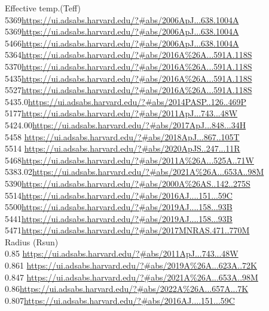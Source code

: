 Effective temp.(Teff)\\
5369\url{https://ui.adsabs.harvard.edu/?#abs/2006ApJ...638.1004A}\\
5369\url{https://ui.adsabs.harvard.edu/?#abs/2006ApJ...638.1004A}\\ 
5466\url{https://ui.adsabs.harvard.edu/?#abs/2006ApJ...638.1004A}\\
5364\url{https://ui.adsabs.harvard.edu/?#abs/2016A%26A...591A.118S}\\
5370\url{https://ui.adsabs.harvard.edu/?#abs/2016A%26A...591A.118S}\\
5435\url{https://ui.adsabs.harvard.edu/?#abs/2016A%26A...591A.118S}\\
5527\url{https://ui.adsabs.harvard.edu/?#abs/2016A%26A...591A.118S}\\
5435.0\url{https://ui.adsabs.harvard.edu/?#abs/2014PASP..126..469P}\\
5177\url{https://ui.adsabs.harvard.edu/?#abs/2011ApJ...743...48W}\\
5424.00\url{https://ui.adsabs.harvard.edu/?#abs/2017ApJ...848...34H}\\

5458 \url{https://ui.adsabs.harvard.edu/?#abs/2018ApJ...867..105T}\\
5514	\url{https://ui.adsabs.harvard.edu/?#abs/2020ApJS..247...11R}\\
5468\url{https://ui.adsabs.harvard.edu/?#abs/2011A%26A...525A..71W}\\
5383.02\url{https://ui.adsabs.harvard.edu/?#abs/2021A%26A...653A..98M}\\
5390\url{https://ui.adsabs.harvard.edu/?#abs/2000A%26AS..142..275S}\\
5514\url{https://ui.adsabs.harvard.edu/?#abs/2016AJ....151...59C}\\
5500\url{https://ui.adsabs.harvard.edu/?#abs/2019AJ....158...93B}\\
5441\url{https://ui.adsabs.harvard.edu/?#abs/2019AJ....158...93B}\\
5471\url{https://ui.adsabs.harvard.edu/?#abs/2017MNRAS.471..770M}\\


Radius (Rsun)\\
0.85	\url{https://ui.adsabs.harvard.edu/?#abs/2011ApJ...743...48W}\\
0.861	\url{https://ui.adsabs.harvard.edu/?#abs/2019A%26A...623A..72K}\\
0.847	\url{https://ui.adsabs.harvard.edu/?#abs/2021A%26A...653A..98M}\\
0.86\url{https://ui.adsabs.harvard.edu/?#abs/2022A%26A...657A...7K}\\
0.807\url{https://ui.adsabs.harvard.edu/?#abs/2016AJ....151...59C}\\

